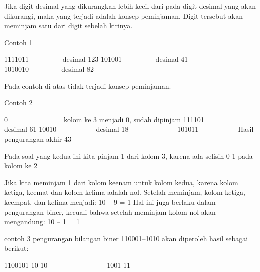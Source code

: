 Jika digit desimal yang dikurangkan lebih kecil dari pada digit desimal yang akan dikurangi, maka yang terjadi adalah konsep peminjaman.
Digit tersebut akan meminjam satu dari digit sebelah kirinya.

Contoh 1

1111011            desimal 123
101001             desimal 41
——————— –
1010010            desimal 82

Pada contoh di atas tidak terjadi konsep peminjaman.

Contoh 2

0                  kolom ke 3 menjadi 0, sudah dipinjam
111101             desimal 61
10010              desimal 18
——–——— –
101011             Hasil pengurangan akhir 43


Pada soal yang kedua ini kita pinjam 1 dari kolom 3, karena ada selisih 0-1 pada kolom ke 2

Jika kita meminjam 1 dari kolom keenam untuk kolom kedua, karena kolom ketiga, keemat dan kolom kelima adalah nol. Setelah meminjam, kolom ketiga, keempat, dan kelima menjadi: 10 – 9 = 1
Hal ini juga berlaku dalam pengurangan biner, kecuali bahwa setelah meminjam kolom nol akan mengandung: 10 – 1 = 1

contoh 3 pengurangan bilangan biner 110001–1010 akan diperoleh hasil sebagai berikut:

1100101
10 10
——————— –
1001 11
